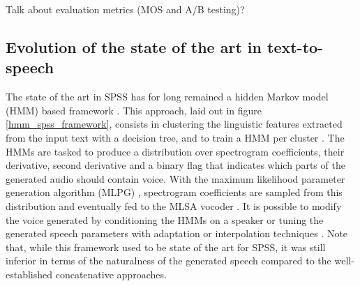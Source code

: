 \documentclass[a4paper, oneside, 12pt, english]{article}
\begin{document}
\color{red}Talk about evaluation metrics (MOS and A/B testing)?\color{black}


\subsection{Evolution of the state of the art in text-to-speech}
The state of the art in SPSS has for long remained a hidden Markov model (HMM) based framework \citep{Tokuda-2013}. This approach, laid out in figure \ref{hmm_spss_framework}, consists in clustering the linguistic features extracted from the input text with a decision tree, and to train a HMM per cluster \citep{HMMTTS}. The HMMs are tasked to produce a distribution over spectrogram coefficients, their derivative, second derivative and a binary flag that indicates which parts of the generated audio should contain voice. With the maximum likelihood parameter generation algorithm (MLPG) \citep{Tokuda-2000}, spectrogram coefficients are sampled from this distribution and eventually fed to the MLSA vocoder \citep{MLSA}. It is possible to modify the voice generated by conditioning the HMMs on a speaker or tuning the generated speech parameters with adaptation or interpolation techniques \citep{HMMSpeakerInterpolation}. Note that, while this framework used to be state of the art for SPSS, it was still inferior in terms of the naturalness of the generated speech compared to the well-established concatenative approaches.
\end{document}

